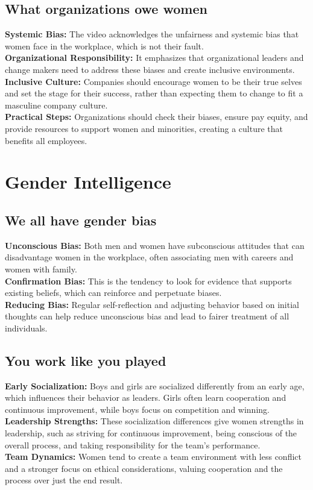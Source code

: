 \documentclass[12pt]{article}
\begin{document}
\subsection{What organizations owe women}
\textbf{Systemic Bias:} The video acknowledges the unfairness and systemic bias that women face in the workplace, which is not their fault.\\
\textbf{Organizational Responsibility:} It emphasizes that organizational leaders and change makers need to address these biases and create inclusive environments.\\
\textbf{Inclusive Culture:} Companies should encourage women to be their true selves and set the stage for their success, rather than expecting them to change to fit a masculine company culture.\\
\textbf{Practical Steps:} Organizations should check their biases, ensure pay equity, and provide resources to support women and minorities, creating a culture that benefits all employees.\\

\newpage
\section{Gender Intelligence}
\subsection{We all have gender bias }
\textbf{Unconscious Bias:}  Both men and women have subconscious attitudes that can disadvantage women in the workplace, often associating men with careers and women with family.\\
\textbf{Confirmation Bias:}  This is the tendency to look for evidence that supports existing beliefs, which can reinforce and perpetuate biases.\\
\textbf{Reducing Bias:}  Regular self-reflection and adjusting behavior based on initial thoughts can help reduce unconscious bias and lead to fairer treatment of all individuals.

\subsection{You work like you played}
\textbf{Early Socialization:}  Boys and girls are socialized differently from an early age, which influences their behavior as leaders. Girls often learn cooperation and continuous improvement, while boys focus on competition and winning.\\
\textbf{Leadership Strengths:}  These socialization differences give women strengths in leadership, such as striving for continuous improvement, being conscious of the overall process, and taking responsibility for the team's performance.\\
\textbf{Team Dynamics:}  Women tend to create a team environment with less conflict and a stronger focus on ethical considerations, valuing cooperation and the process over just the end result.
\end{document}
